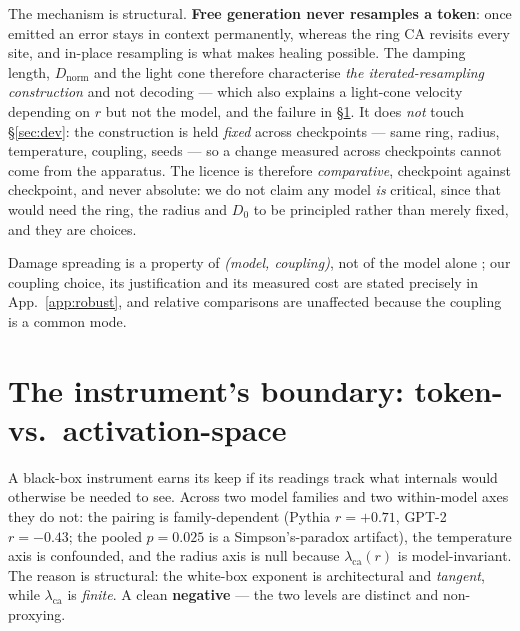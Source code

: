 \documentclass{article}
\newcommand{\dn}{\ensuremath{D_{\mathrm{norm}}}}
\newcommand{\dz}{\ensuremath{D_0}}
\newcommand{\lca}{\ensuremath{\lambda_{\mathrm{ca}}}}
\begin{document}
The mechanism is structural. \textbf{Free generation never resamples a token}: once emitted an
error stays in context permanently, whereas the ring CA revisits every site, and in-place
resampling is what makes healing possible. The damping length, \dn{} and the light cone therefore
characterise \emph{the iterated-resampling construction} and not decoding --- which also explains
a light-cone velocity depending on $r$ but not the model, and the failure in
\S\ref{sec:crosslevel}. It does \emph{not} touch \S\ref{sec:dev}: the construction is
held \emph{fixed} across checkpoints --- same ring, radius, temperature, coupling, seeds --- so a change
measured across checkpoints cannot come from the apparatus. The licence is therefore
\emph{comparative}, checkpoint against checkpoint, and never absolute: we do not claim any model
\emph{is} critical, since that would need the ring, the radius and \dz{} to be principled rather
than merely fixed, and they are choices.

Damage spreading is a property of \emph{(model, coupling)}, not of the model alone
\citep{kohring1992,grassberger1995}; our coupling choice, its justification and its measured
cost are stated precisely in App.~\ref{app:robust}, and relative comparisons are unaffected
because the coupling is a common mode.

\section{The instrument's boundary: token- vs.\ activation-space}\label{sec:crosslevel}
A black-box instrument earns its keep if its readings track what internals would otherwise be
needed to see. Across two model families and two within-model axes they do not: the pairing is
family-dependent (Pythia $r{=}{+}0.71$, GPT-2 $r{=}{-}0.43$; the pooled $p{=}0.025$ is a
Simpson's-paradox artifact), the temperature axis is confounded, and the radius axis is null
because $\lca(r)$ is model-invariant. The reason is structural: the white-box exponent is
architectural and \emph{tangent}, while $\lca$ is \emph{finite}. A clean \textbf{negative} --- the
two levels are distinct and non-proxying.
\end{document}
